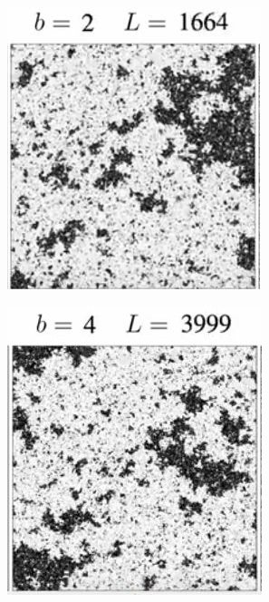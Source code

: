 \documentclass[]{article}
\begin{document}
\begin{figure}[H]
	\caption{Evolving $T=T_c$ after \cite{ashton2012renormalization}}
	\begin{subfigure}[t]{0.3\textwidth}
		\includegraphics[width=\textwidth]{DouglasAshton3-1}
	\end{subfigure}
	\begin{subfigure}[t]{0.3\textwidth}
		\includegraphics[width=\textwidth]{DouglasAshton3-2}

\end{subfigure}
\end{figure}
\end{document}
